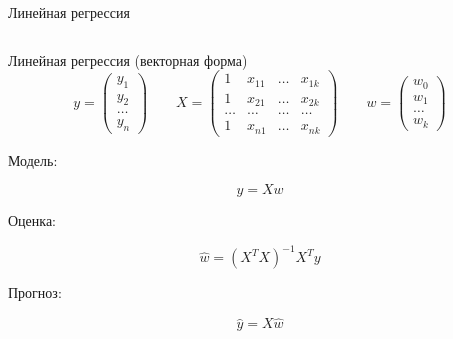 \documentclass[notes,12pt, aspectratio=169]{beamer}
\begin{document}
\begin{frame}{Линейная регрессия}
\begin{columns}[T]
\end{columns}
\end{frame}



\begin{frame}{Линейная регрессия (векторная форма)}
\[
y = \begin{pmatrix} y_1 \\ y_2 \\ \ldots \\ y_n \end{pmatrix}  \qquad X = \begin{pmatrix} 1 & x_{11} & \ldots & x_{1k} \\ 1 & x_{21} & \ldots & x_{2k} \\ \ldots & \ldots & \ldots & \dots \\ 1 & x_{n1} & \ldots & x_{nk} \end{pmatrix}  \qquad  w = \begin{pmatrix} w_0 \\ w_1 \\ \ldots \\ w_k \end{pmatrix}
\]

Модель:

\[
y = Xw
\]

Оценка:

\[
\hat w = (X^T X)^{-1} X^T y
\]

Прогноз:

\[
\hat y = X \hat{w}
\]
\end{frame}
\end{document}
